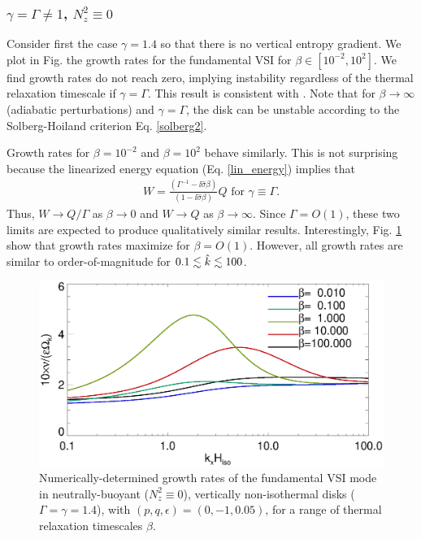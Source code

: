 \subsubsection{$\gamma=\Gamma \neq 1$, $N_z^2\equiv 0$}
Consider first the case $\gamma=1.4$ so that there is no vertical
entropy gradient. We plot in Fig. the growth rates for the
fundamental VSI for $\beta\in[10^{-2},10^{2}]$. We find growth rates
do not reach zero, implying instability regardless of the thermal
relaxation timescale if $\gamma=\Gamma$. This result is consistent
with \cite{nelson13}.  Note that for $\beta\to\infty$ (adiabatic
perturbations) and $\gamma=\Gamma$, the disk can be unstable according
to the Solberg-Hoiland criterion  Eq. \ref{solberg2}.

Growth rates for $\beta = 10^{-2}$ and
$\beta=10^{2}$ behave similarly. This is not surprising because
the linearized energy equation (Eq. \ref{lin_energy}) implies that 
\begin{align}
  W = \frac{\left(\Gamma^{-1} -
      \ii\hat{\sigma}\beta\right)}{\left(1-\ii\hat{\sigma}\beta\right)}
  Q \text{ for } \gamma\equiv \Gamma.   
\end{align}
Thus, $W \to Q/\Gamma$ as $\beta\to0$ and $W\to Q$ as
$\beta\to\infty$. Since $\Gamma=O(1)$, these two limits are expected
to produce qualitatively similar results. Interestingly,
Fig. \ref{growth_vnoniso1} show that growth rates 
maximize for $\beta=O(1)$. However, all growth rates are similar to
order-of-magnitude for $0.1\lesssim\hat{k}\lesssim 100$. 

\begin{figure}
  \includegraphics[width=\linewidth,clip=true,trim=0cm 0cm 0cm
  0cm]{figures/growth_vnoniso1} 
  \caption{Numerically-determined growth rates of the fundamental VSI
    mode in neutrally-buoyant ($N_z^2\equiv0$), vertically non-isothermal disks
    ($\Gamma=\gamma=1.4$), with $(p,q,\epsilon)=(0,-1,0.05)$, for
    a range of thermal relaxation timescales 
    $\beta$. \label{growth_vnoniso1}}     
\end{figure} 

